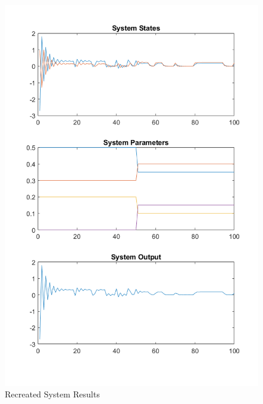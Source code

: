 \documentclass[]{ieeetran}
\begin{document}
\begin{figure}
	\centering
	\includegraphics[width=\linewidth]{../../fig/SystemResponse_no_attack}
	\caption{Recreated System Results}
	\label{fig:systemresponsenoattack}
\end{figure}
\end{document}
